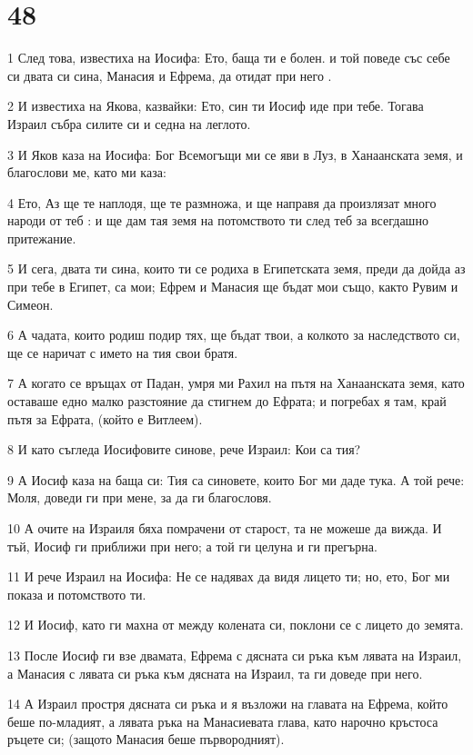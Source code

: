 \chapter{48}

\par 1 След това, известиха на Иосифа: Ето, баща ти е болен. и той поведе със себе си двата си сина, Манасия и Ефрема, да отидат при него .
\par 2 И известиха на Якова, казвайки: Ето, син ти Иосиф иде при тебе. Тогава Израил събра силите си и седна на леглото.
\par 3 И Яков каза на Иосифа: Бог Всемогъщи ми се яви в Луз, в Ханаанската земя, и благослови ме, като ми каза:
\par 4 Ето, Аз ще те наплодя, ще те размножа, и ще направя да произлязат много народи от теб : и ще дам тая земя на потомството ти след теб за всегдашно притежание.
\par 5 И сега, двата ти сина, които ти се родиха в Египетската земя, преди да дойда аз при тебе в Египет, са мои; Ефрем и Манасия ще бъдат мои също, както Рувим и Симеон.
\par 6 А чадата, които родиш подир тях, ще бъдат твои, а колкото за наследството си, ще се наричат с името на тия свои братя.
\par 7 А когато се връщах от Падан, умря ми Рахил на пътя на Ханаанската земя, като оставаше едно малко разстояние да стигнем до Ефрата; и погребах я там, край пътя за Ефрата, (който е Витлеем).
\par 8 И като съгледа Иосифовите синове, рече Израил: Кои са тия?
\par 9 А Иосиф каза на баща си: Тия са синовете, които Бог ми даде тука. А той рече: Моля, доведи ги при мене, за да ги благословя.
\par 10 А очите на Израиля бяха помрачени от старост, та не можеше да вижда. И тъй, Иосиф ги приближи при него; а той ги целуна и ги прегърна.
\par 11 И рече Израил на Иосифа: Не се надявах да видя лицето ти; но, ето, Бог ми показа и потомството ти.
\par 12 И Иосиф, като ги махна от между колената си, поклони се с лицето до земята.
\par 13 После Иосиф ги взе двамата, Ефрема с дясната си ръка към лявата на Израил, а Манасия с лявата си ръка към дясната на Израил, та ги доведе при него.
\par 14 А Израил простря дясната си ръка и я възложи на главата на Ефрема, който беше по-младият, а лявата ръка на Манасиевата глава, като нарочно кръстоса ръцете си; (защото Манасия беше първородният).
